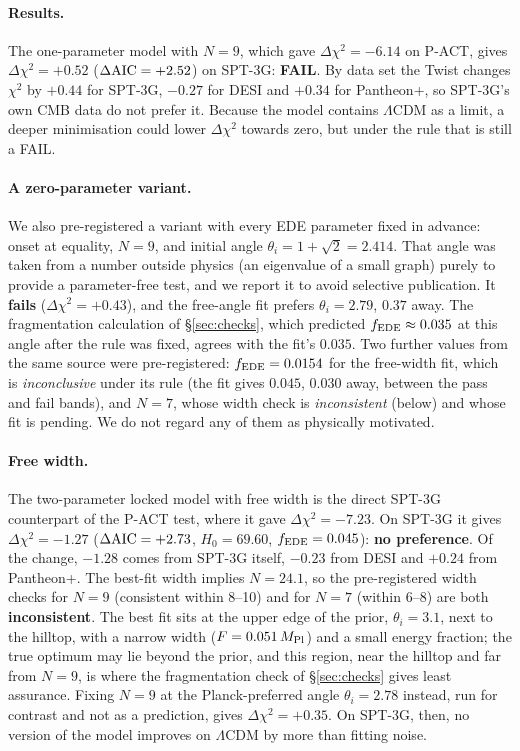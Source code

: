 \documentclass[11pt]{article}
\newcommand{\Mp}{M_{\rm Pl}}
\newcommand{\SPTfreeDchi}{\ensuremath{-1.27}}   %
\newcommand{\SPTfreeHz}{\ensuremath{69.60}}     %
\newcommand{\SPTfreeF}{\ensuremath{0.045}}      %
\newcommand{\SPTfreeN}{\ensuremath{24.1}}       %
\newcommand{\SPTsevenVerdict}{pending}
\begin{document}
\paragraph{Results.} The one-parameter model with $N=9$, which gave $\Delta\chi^2=-6.14$ on P-ACT,
gives $\Delta\chi^2=+0.52$ ($\Delta{\rm AIC}=+2.52$) on SPT-3G: \textbf{FAIL}. By data set the Twist
changes $\chi^2$ by $+0.44$ for SPT-3G, $-0.27$ for DESI and $+0.34$ for Pantheon+, so SPT-3G's own CMB
data do not prefer it. Because the model contains $\Lambda$CDM as a limit, a deeper minimisation could
lower $\Delta\chi^2$ towards zero, but under the rule that is still a FAIL.

\paragraph{A zero-parameter variant.} We also pre-registered a variant with every EDE parameter fixed in
advance: onset at equality, $N=9$, and initial angle $\theta_i=1+\sqrt2=2.414$. That angle was taken
from a number outside physics (an eigenvalue of a small graph) purely to provide a parameter-free test,
and we report it to avoid selective publication. It \textbf{fails} ($\Delta\chi^2=+0.43$), and the
free-angle fit prefers $\theta_i=2.79$, $0.37$ away. The fragmentation calculation of
\S\ref{sec:checks}, which predicted $f_{\rm EDE}\approx0.035$ at this angle after the rule was fixed,
agrees with the fit's $0.035$. Two further values from the same source were pre-registered: $f_{\rm EDE}=0.0154$
for the free-width fit, which is \emph{inconclusive} under its rule (the fit gives $0.045$, $0.030$ away, between
the pass and fail bands), and $N=7$, whose width check is \emph{inconsistent} (below) and whose fit is
\SPTsevenVerdict. We do not regard any of them as physically motivated.

\paragraph{Free width.} The two-parameter locked model with free width is the direct SPT-3G counterpart
of the P-ACT test, where it gave $\Delta\chi^2=-7.23$. On SPT-3G it gives $\Delta\chi^2=\SPTfreeDchi$
($\Delta{\rm AIC}=+2.73$, $H_0=\SPTfreeHz$, $f_{\rm EDE}=\SPTfreeF$): \textbf{no preference}. Of the change,
$-1.28$ comes from SPT-3G itself, $-0.23$ from DESI and $+0.24$ from Pantheon+. The best-fit width implies
$N=\SPTfreeN$, so the pre-registered width checks for $N=9$ (consistent within 8--10) and for $N=7$
(within 6--8) are both \textbf{inconsistent}. The best fit sits at the upper edge of the prior,
$\theta_i=3.1$, next to the hilltop, with a narrow width ($F=0.051\,\Mp$) and a small energy fraction; the
true optimum may lie beyond the prior, and this region, near the hilltop and far from $N=9$, is where the
fragmentation check of \S\ref{sec:checks} gives least assurance. Fixing $N=9$ at the Planck-preferred angle
$\theta_i=2.78$ instead, run for contrast and not as a prediction, gives $\Delta\chi^2=+0.35$. On SPT-3G, then,
no version of the model improves on $\Lambda$CDM by more than fitting noise.
\end{document}
